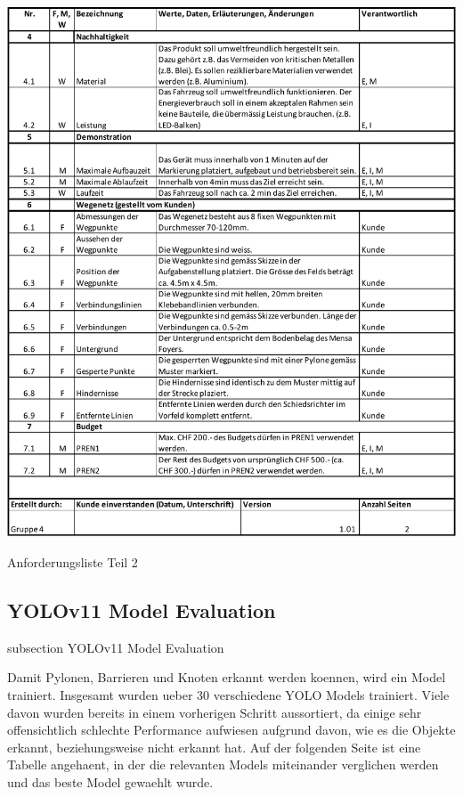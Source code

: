 \begin{table}[H]
\centering
\includegraphics[width=\textwidth]{assets/projektmanagement/Anforderungsliste_V1.01_page2.pdf}
\caption{Anforderungsliste Teil 2}
\label{table:anforderungsliste_page2}
\end{table}
\newpage



\subsection*{YOLOv11 Model Evaluation}\label{model-evaluation}
    {subsection}
    {YOLOv11 Model Evaluation}

Damit Pylonen, Barrieren und Knoten erkannt werden koennen, wird ein Model trainiert. Insgesamt wurden ueber 30 verschiedene YOLO Models trainiert. Viele davon wurden bereits in einem vorherigen Schritt aussortiert, da einige sehr offensichtlich schlechte Performance aufwiesen aufgrund davon, wie es die Objekte erkannt, beziehungsweise nicht erkannt hat. Auf der folgenden Seite ist eine Tabelle angehaent, in der die relevanten Models miteinander verglichen werden und das beste Model gewaehlt wurde.

